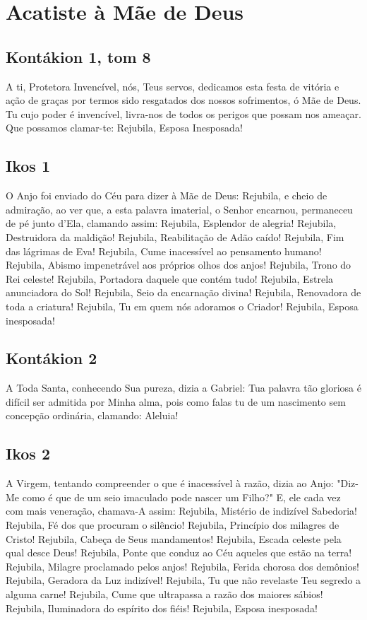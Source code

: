 \documentclass{subfiles}
\begin{document}
\chapter{Acatiste à Mãe de Deus}

\section*{Kontákion 1, tom 8}

A ti, Protetora Invencível, nós, Teus servos, dedicamos esta festa de
vitória e ação de graças por termos sido resgatados dos nossos sofrimentos, ó
Mãe de Deus. Tu cujo poder é invencível, livra-nos de todos os perigos que
possam nos ameaçar. Que possamos clamar-te: Rejubila, Esposa Inesposada!

\section*{Ikos 1}

O Anjo foi enviado do Céu para dizer à Mãe de Deus: Rejubila, e cheio
de admiração, ao ver que, a esta palavra imaterial, o Senhor encarnou,
permaneceu de pé junto d'Ela, clamando assim:
Rejubila, Esplendor de alegria!
Rejubila, Destruidora da maldição!
Rejubila, Reabilitação de Adão caído!
Rejubila, Fim das lágrimas de Eva!
Rejubila, Cume inacessível ao pensamento humano!
Rejubila, Abismo impenetrável aos próprios olhos dos anjos!
Rejubila, Trono do Rei celeste!
Rejubila, Portadora daquele que contém tudo!
Rejubila, Estrela anunciadora do Sol!
Rejubila, Seio da encarnação divina!
Rejubila, Renovadora de toda a criatura!
Rejubila, Tu em quem nós adoramos o Criador!
Rejubila, Esposa inesposada!


\section*{Kontákion 2}

A Toda Santa, conhecendo Sua pureza, dizia a Gabriel: Tua palavra tão
gloriosa é difícil ser admitida por Minha alma, pois como falas tu de um
nascimento sem concepção ordinária, clamando: Aleluia!

\section*{Ikos 2}

A Virgem, tentando compreender o que é inacessível à razão, dizia ao
Anjo: "Diz-Me como é que de um seio imaculado pode nascer um Filho?" E, ele
cada vez com mais veneração, chamava-A assim:
Rejubila, Mistério de indizível Sabedoria!
Rejubila, Fé dos que procuram o silêncio!
Rejubila, Princípio dos milagres de Cristo!
Rejubila, Cabeça de Seus mandamentos!
Rejubila, Escada celeste pela qual desce Deus!
Rejubila, Ponte que conduz ao Céu aqueles que estão na terra!
Rejubila, Milagre proclamado pelos anjos!
Rejubila, Ferida chorosa dos demônios!
Rejubila, Geradora da Luz indizível!
Rejubila, Tu que não revelaste Teu segredo a alguma carne!
Rejubila, Cume que ultrapassa a razão dos maiores sábios!
Rejubila, Iluminadora do espírito dos fiéis!
Rejubila, Esposa inesposada!
\end{document}
